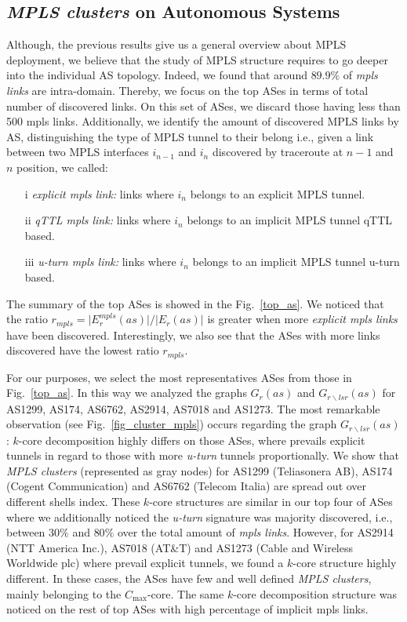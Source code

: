 \subsection{\textit{MPLS clusters} on Autonomous Systems}\label{cluster.as}
Although, the previous results give us a general overview about MPLS deployment,
we believe that the study of MPLS structure requires to go deeper into the
individual AS topology. Indeed, we found that around $89.9\%$ of \textit{mpls
links} are intra-domain. Thereby, we focus on the top ASes in terms of total
number of discovered links.  On this set of ASes, we discard those having less
than 500 mpls links. Additionally, we identify the amount of discovered MPLS
links by AS, distinguishing the type of MPLS tunnel to their belong i.e., given
a link between two MPLS interfaces $i_{n-1}$  and $i_{n}$ discovered by 
traceroute at $n-1$ and $n$ position, we called:

\begin{itemize}
  \item[i] \textit{explicit mpls link:} links 
  where $i_{n}$ belongs  to an explicit MPLS tunnel.
  \item[ii] \textit{qTTL mpls link:} links 
  where $i_{n}$ belongs  to an implicit MPLS tunnel qTTL based.
  \item[iii] \textit{u-turn mpls link:} links 
  where $i_{n}$ belongs  to an implicit MPLS tunnel u-turn based.
\end{itemize}

The summary of the top ASes is showed in the Fig.~\ref{top_as}.
We noticed that the ratio $r_{mpls}= \vert E^{mpls}_{r} (as) \vert /\vert E_{r}
(as) \vert $  is greater when more  \textit{explicit mpls links} have been
discovered. Interestingly, we also see that the ASes with more links discovered
have the lowest ratio $r_{mpls}$.

For our purposes, we select the most representatives ASes from those in
Fig.~\ref{top_as}. In this way we analyzed the graphs $G_{r}(as)$ and
$G_{r\backslash lsr}(as)$ for AS1299, AS174, AS6762, AS2914, AS7018 and AS1273.
The most remarkable observation (see Fig.~\ref{fig_cluster_mpls}) occurs
regarding the graph $G_{r\backslash lsr}(as)$: $k$-core decomposition highly
differs on those ASes, where prevails explicit tunnels in regard to those with
more \textit{u-turn} tunnels proportionally. We show that \textit{MPLS clusters}
(represented as gray nodes) for  AS1299 (Teliasonera AB), AS174 (Cogent
Communication) and AS6762 (Telecom Italia) are spread out over different shells
index. These $k$-core structures are similar in our top four of ASes where we
additionally noticed  the \textit{u-turn} signature was majority discovered,
i.e., between $30\%$ and  $80\%$ over  the total amount of \textit{mpls links}.
However, for  AS2914 (NTT America Inc.), AS7018 (AT\&T) and AS1273 (Cable and
 Wireless Worldwide plc) where prevail explicit tunnels, we found a $k$-core
structure highly different. In these cases,  the ASes have few and well defined
\textit{MPLS clusters}, mainly belonging to the $C_{\max}$-core.
The same $k$-core decomposition structure was noticed  on the rest of top ASes
with high percentage of implicit mpls links.

